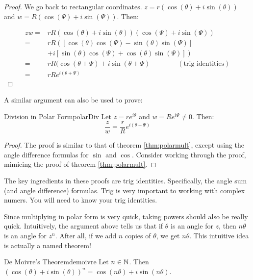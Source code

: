 \begin{proof} We go back to rectangular coordinates. $z = r(\cos(\theta) + i\sin(\theta))$ and $w = R(\cos(\Psi) + i\sin(\Psi))$. Then:

\begin{align*} zw =& rR(\cos(\theta) + i\sin(\theta))(\cos(\Psi) + i\sin(\Psi))\\
=& rR\left(\left[\cos(\theta)\cos(\Psi) - \sin(\theta)\sin(\Psi)\right]\right.\\
& +\left. i\left[\sin(\theta)\cos(\Psi) + \cos(\theta)\sin(\Psi)\right]\right)\\
=&rR(\cos(\theta + \Psi) + i\sin(\theta + \Psi) \qquad\qquad (\text{trig identities})\\
=&rRe^{i(\theta + \Psi)}
\end{align*}

\end{proof}

A similar argument can also be used to prove: 

\begin{thmbo}{Division in Polar Form}{polarDiv} 
 Let $z = re^{i\theta}$ and $w = Re^{i\Psi}\ne 0$. Then:
$$\frac{z}{w} = \frac{r}{R}e^{i(\theta - \Psi)}$$
\end{thmbo}

\begin{proof} The proof is similar to that of theorem \ref{thm:polarmult}, except using the angle difference formulas for $\sin$ and $\cos$. Consider working through the proof, mimicing the proof of theorem \ref{thm:polarmult}.\end{proof}

\begin{note} The key ingredients in these proofs are trig identities. Specifically, the angle sum (and angle difference) formulas. Trig is very important to working with complex numers. You will need to know your trig identities. \end{note}


Since multiplying in polar form is very quick, taking powers should also be really quick. Intuitively, the argument above tells us that if $\theta$ is an angle for $z$, then $n\theta$ is an angle for $z^n$. After all, if we add $n$ copies of $\theta$, we get $n\theta$. This intuitive idea is actually a named theorem!

\begin{thmbo}{De Moivre's Theorem}{demoivre} 
Let $n\in \mathbb{N}$. Then $(\cos(\theta) + i\sin(\theta))^n = \cos(n\theta) + i\sin(n\theta)$.
\end{thmbo}

